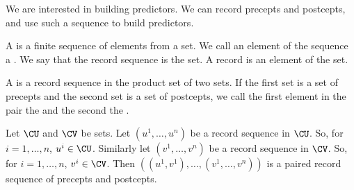 
\sbasic








\sstart
{}


We are interested in building predictors.
We can record
precepts and postcepts, and use such a sequence
to build predictors.


A 
is a finite sequence of elements
from a set.
We call an element of the sequence
a .
We say that the record sequence
is  the set. A record
is an element of the set.

A 
is a record sequence in the
product set of two sets. If the first set
is a set of precepts and the second set is
a set of postcepts,
we call the first element
in the pair the 
and the second the .


Let $\CU$ and $\CV$ be sets.
Let $(u^1, \dots, u^n)$ be a record sequence in $\CU$.
So, for $i = 1, \dots, n$, $u^i \in \CU$.
Similarly let $(v^1, \dots, v^n)$ be a record sequence in $\CV$.
So, for $i = 1, \dots, n$, $v^i \in \CV$.
Then $((u^1, v^1), \dots, (v^1, \dots, v^n))$
is a paired record sequence of precepts and postcepts.
\strats
